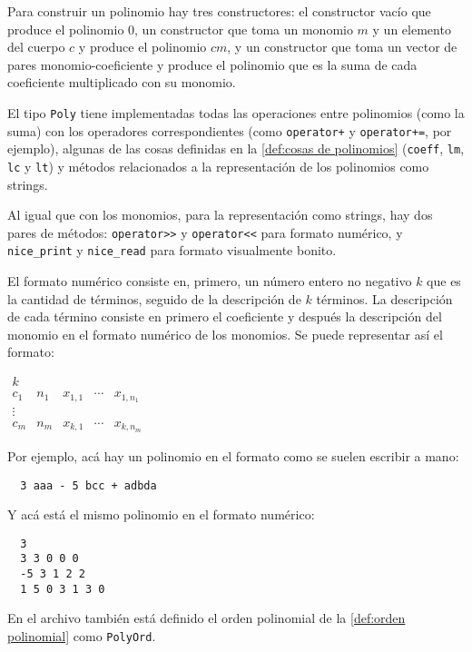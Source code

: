 \documentclass[12pt]{report}
\theoremstyle{customstyle}
\theoremstyle{factstyle}
\begin{document}
Para construir un polinomio hay tres constructores: el constructor vacío que produce el polinomio $0$, un constructor que toma un monomio $m$ y un elemento del cuerpo $c$ y produce el polinomio $cm$, y un constructor que toma un vector de pares monomio-coeficiente y produce el polinomio que es la suma de cada coeficiente multiplicado con su monomio.

El tipo \texttt{Poly} tiene implementadas todas las operaciones entre polinomios (como la suma) con los operadores correspondientes (como \texttt{operator+} y \texttt{operator+=}, por ejemplo), algunas de las cosas definidas en la \cref{def:cosas de polinomios} (\texttt{coeff}, \texttt{lm}, \texttt{lc} y \texttt{lt}) y métodos relacionados a la representación de los polinomios como strings. %

Al igual que con los monomios, para la representación como strings, hay dos pares de métodos: \texttt{operator>>} y \texttt{operator<<} para formato numérico, y \texttt{nice\_print} y \texttt{nice\_read} para formato visualmente bonito.

El formato numérico consiste en, primero, un número entero no negativo $k$ que es la cantidad de términos, seguido de la descripción de $k$ términos. La descripción de cada término consiste en primero el coeficiente y después la descripción del monomio en el formato numérico de los monomios. Se puede representar así el formato:

$\begin{array}{llllll}
  k &&&& \\
  c_1 & n_1 & x_{1, 1} & ⋯ & x_{1, n_1} \\
  ⋮ &&&& \\
  c_m & n_m & x_{k, 1} & ⋯ & x_{k, n_m}
\end{array}$

Por ejemplo, acá hay un polinomio en el formato como se suelen escribir a mano:

\begin{lstlisting}
  3 aaa - 5 bcc + adbda
\end{lstlisting}

\noindent Y acá está el mismo polinomio en el formato numérico:

\begin{lstlisting}
  3
  3 3 0 0 0
  -5 3 1 2 2
  1 5 0 3 1 3 0
\end{lstlisting}

En el archivo  también está definido el orden polinomial de la \cref{def:orden polinomial} como \texttt{PolyOrd}.
\end{document}
